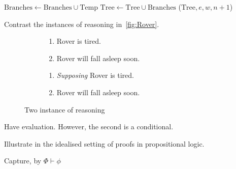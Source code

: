 \begin{algorithm}[H]
{{{          \(\text{Branches} \longleftarrow \text{Branches} \cup \text{Temp}\)\;
          \label{PrAl:dev-tree:Stops:cond:else:futureB:loop:gather}
        }
        \label{PrAl:dev-tree:Stops:cond:else:futureB:end}
        {
          \(\text{Tree} \longleftarrow \text{Tree} \cup \text{Branches}\)\;
          \label{PrAl:dev-tree:Stops:cond:else:futureB:process:expand}
          \AlgDevelopTree{}(\(\text{Tree}, e,w, n+1\))\;
          \label{PrAl:dev-tree:Stops:cond:else:futureB:process:end}
        }
        \label{PrAl:dev-tree:Stops:cond:else:end}
      }
      \label{PrAl:dev-tree:Stops:cond:end}
    }
  \end{algorithm}

  Contrast the instances of reasoning in~\autoref{fig:Rover}.
  \begin{figure}[h!]
    \mbox{}\hfill
    \begin{subfigure}{0.45\linewidth}
      \begin{enumerate}[label=\arabic*.,ref=(\arabic*)]
      \item
        \label{fig:Rover:CS:1}
        Rover is tired.
      \item
        \label{fig:Rover:CS:2}
        Rover will fall asleep soon.
      \end{enumerate}
      \caption{}
      \label{fig:Rover:CS}
    \end{subfigure}
    \hfill
    \begin{subfigure}{0.45\linewidth}
      \begin{enumerate}[label=\arabic*\('\).,ref=(\arabic*\('\))]
      \item
        \label{fig:Rover:nCS:1}
        \emph{Supposing} Rover is tired.
      \item
        \label{fig:Rover:nCS:2}
        Rover will fall asleep soon.
      \end{enumerate}
      \caption{}
      \label{fig:Rover:nCS}
    \end{subfigure}
    \hfill\mbox{}
    \caption{Two instance of reasoning}
    \label{fig:Rover}
  \end{figure}
  Have evaluation.
  However, the second is a conditional.

\begin{note}
  Illustrate in the idealised setting of proofs in propositional logic.

  Capture, \ros{} by \(\Phi \vdash \phi\)

\end{note}


